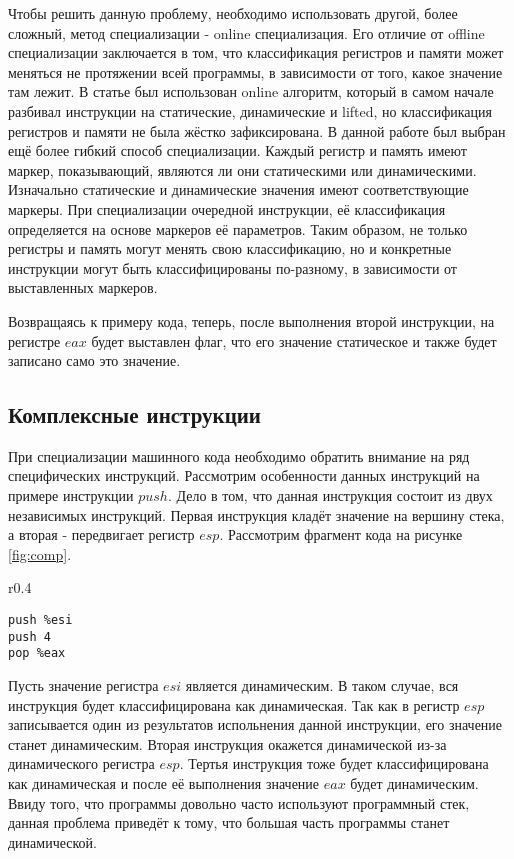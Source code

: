\documentclass{spbau-diploma}
\begin{document}
Чтобы решить данную проблему, необходимо использовать другой, более сложный, метод специализации - online специализация. Его отличие от offline специализации заключается в том, что классификация регистров и памяти может меняться не протяжении всей программы, в зависимости от того, какое значение там лежит. В статье \cite{PEMC} был использован online алгоритм, который в самом начале разбивал инструкции на статические, динамические и lifted, но классификация регистров и памяти не была жёстко зафиксирована. В данной работе был выбран ещё более гибкий способ специализации. Каждый регистр и память имеют маркер, показывающий, являются ли они статическими или динамическими. Изначально статические и динамические значения имеют соответствующие маркеры. При специализации очередной инструкции, её классификация определяется на основе маркеров её параметров. Таким образом, не только регистры и память могут менять свою классификацию, но и конкретные инструкции могут быть классифицированы по-разному, в зависимости от выставленных маркеров.

Возвращаясь к примеру кода, теперь, после выполнения второй инструкции, на регистре $eax$ будет выставлен флаг, что его значение статическое и также будет записано само это значение.

\subsection{ Комплексные инструкции}
\label{part:4.2}
При специализации машинного кода необходимо обратить внимание на ряд специфических инструкций. Рассмотрим особенности данных инструкций на примере инструкции $push$. Дело в том, что данная инструкция состоит из двух независимых инструкций. Первая инструкция кладёт значение на вершину стека, а вторая - передвигает регистр $esp$. Рассмотрим фрагмент кода на рисунке \ref{fig:comp}.
\begin{wrapfigure}{r}{0.4\textwidth}
\begin{lstlisting}[xleftmargin = 20pt]
push %esi
push 4
pop %eax
\end{lstlisting}
\caption{Фрагмент кода}
\label{fig:comp}
\end{wrapfigure}
Пусть значение регистра $esi$ является динамическим. В таком случае, вся инструкция будет классифицирована как динамическая. Так как в регистр $esp$ записывается один из результатов испольнения данной инструкции, его значение станет динамическим. Вторая инструкция окажется динамической из-за динамического регистра $esp$. Тертья инструкция тоже будет классифицирована как  динамическая и после её выполнения значение $eax$ будет динамическим. Ввиду того, что программы довольно часто используют программный стек, данная проблема приведёт к тому, что большая часть программы станет динамической.
\end{document}
